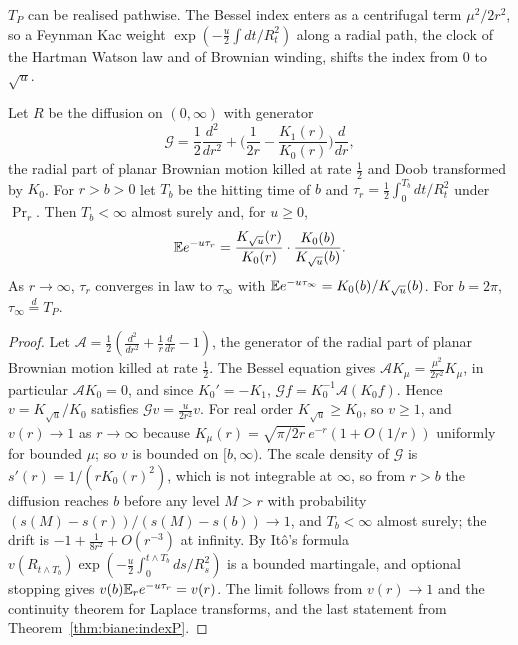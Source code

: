 $T_P$ can be realised pathwise. The Bessel index enters as a centrifugal term $\mu^2/2r^2$, so a Feynman Kac weight $\exp(-\frac u2\int dt/R_t^2)$ along a radial path, the clock of the Hartman Watson law and of Brownian winding, shifts the index from $0$ to $\sqrt u$.

\begin{theorem}\label{thm:biane:clock}
Let $R$ be the diffusion on $(0,\infty)$ with generator
\[
\mathcal G=\frac12\frac{d^2}{dr^2}+\Big(\frac1{2r}-\frac{K_1(r)}{K_0(r)}\Big)\frac d{dr},
\]
the radial part of planar Brownian motion killed at rate $\frac12$ and Doob transformed by $K_0$. For $r>b>0$ let $T_b$ be the hitting time of $b$ and $\tau_r=\frac12\int_0^{T_b}dt/R_t^2$ under $\Pr_r$. Then $T_b<\infty$ almost surely and, for $u\ge0$,
\[
\mathbb{E} e^{-u\tau_r}=\frac{K_{\sqrt u}(r)}{K_0(r)}\cdot\frac{K_0(b)}{K_{\sqrt u}(b)} .
\]
As $r\to\infty$, $\tau_r$ converges in law to $\tau_\infty$ with $\mathbb{E} e^{-u\tau_\infty}=K_0(b)/K_{\sqrt u}(b)$. For $b=2\pi$, $\tau_\infty\overset d=T_P$.
\end{theorem}

\begin{proof}
Let $\mathcal A=\frac12(\frac{d^2}{dr^2}+\frac1r\frac d{dr}-1)$, the generator of the radial part of planar Brownian motion killed at rate $\frac12$. The Bessel equation gives $\mathcal AK_\mu=\frac{\mu^2}{2r^2}K_\mu$, in particular $\mathcal AK_0=0$, and since $K_0'=-K_1$, $\mathcal Gf=K_0^{-1}\mathcal A(K_0f)$. Hence $v=K_{\sqrt u}/K_0$ satisfies $\mathcal Gv=\frac u{2r^2}v$. For real order $K_{\sqrt u}\ge K_0$, so $v\ge1$, and $v(r)\to1$ as $r\to\infty$ because $K_\mu(r)=\sqrt{\pi/2r}\,e^{-r}(1+O(1/r))$ uniformly for bounded $\mu$; so $v$ is bounded on $[b,\infty)$. The scale density of $\mathcal G$ is $s'(r)=1/(rK_0(r)^2)$, which is not integrable at $\infty$, so from $r>b$ the diffusion reaches $b$ before any level $M>r$ with probability $(s(M)-s(r))/(s(M)-s(b))\to1$, and $T_b<\infty$ almost surely; the drift is $-1+\frac1{8r^2}+O(r^{-3})$ at infinity. By It\^o's formula $v(R_{t\wedge T_b})\exp(-\frac u2\int_0^{t\wedge T_b}ds/R_s^2)$ is a bounded martingale, and optional stopping gives $v(b)\mathbb{E}_re^{-u\tau_r}=v(r)$. The limit follows from $v(r)\to1$ and the continuity theorem for Laplace transforms, and the last statement from Theorem~\ref{thm:biane:indexP}.
\end{proof}

